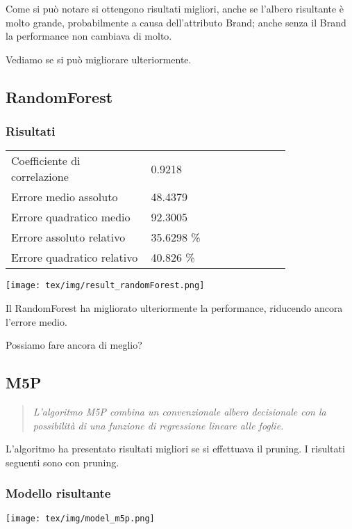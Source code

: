 \documentclass[12pt]{report}
\begin{document}
Come si può notare si ottengono risultati migliori, anche se l'albero risultante è molto grande,
probabilmente a causa dell'attributo Brand; anche senza il Brand la performance non cambiava di molto.

Vediamo se si può migliorare ulteriormente.

\newpage
\subsection{RandomForest}
\subsubsection{Risultati}
\begin{table}[ht]
	\centering
	\begin{tabular}{p{0.4\linewidth}p{0.4\linewidth}}
		Coefficiente di correlazione & 0.9218     \\
		Errore medio assoluto        & 48.4379    \\
		Errore quadratico medio      & 92.3005    \\
		Errore assoluto relativo     & 35.6298 \% \\
		Errore quadratico relativo   & 40.826 \%  \\
	\end{tabular}
\end{table}
\texttt{[image: tex/img/result\_randomForest.png]}

Il RandomForest ha migliorato ulteriormente la performance, riducendo ancora l'errore medio.

Possiamo fare ancora di meglio?

\newpage
\subsection{M5P}

\begin{quote}
	\textit{
		L'algoritmo M5P combina un convenzionale albero decisionale con la
		possibilità di una funzione di regressione lineare alle foglie.
	}
\end{quote}

L'algoritmo ha presentato risultati migliori se si effettuava il pruning. I risultati seguenti sono con pruning.

\subsubsection{Modello risultante}
\texttt{[image: tex/img/model\_m5p.png]}
\end{document}
